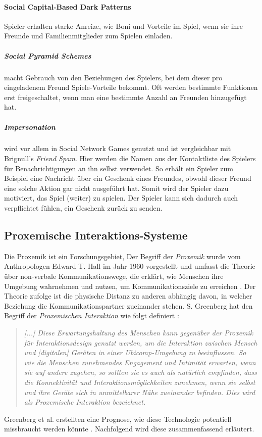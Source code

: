 \documentclass[a4paper]{article}
\newcommand{\todo}[1]{{\color{purple}{#1}}}
\begin{document}
\paragraph{Social Capital-Based Dark Patterns}
Spieler erhalten starke Anreize, wie Boni und Vorteile im Spiel, wenn sie ihre Freunde und Familienmitglieder zum Spielen einladen.

\subparagraph{Social Pyramid Schemes} macht Gebrauch von den Beziehungen des Spielers, bei dem dieser pro eingeladenem Freund Spiele-Vorteile bekommt. Oft werden bestimmte Funktionen erst freigeschaltet, wenn man eine bestimmte Anzahl an Freunden hinzugefügt hat.

\subparagraph{Impersonation} wird vor allem in Social Network Games genutzt und ist vergleichbar mit Brignull's \textit{Friend Spam}. Hier werden die Namen aus der Kontaktliste des Spielers für Benachrichtigungen an ihn selbst verwendet. So erhält ein Spieler zum Beispiel eine Nachricht über ein Geschenk eines Freundes, obwohl dieser Freund eine solche Aktion gar nicht ausgeführt hat. Somit wird der Spieler dazu motiviert, das Spiel (weiter) zu spielen. Der Spieler kann sich dadurch auch verpflichtet fühlen, ein Geschenk zurück zu senden.

\subsection{Proxemische Interaktions-Systeme}
\label{sub:proxemische_interaktions-systeme}{}
Die Proxemik ist ein Forschungsgebiet, 
Der Begriff der \textit{Proxemik} wurde vom Anthropologen Edward T. Hall im Jahr 1960 vorgestellt und umfasst die Theorie über non-verbale Kommunikationswege, die erklärt, wie Menschen ihre Umgebung wahrnehmen und nutzen, um Kommunikationsziele zu erreichen \cite{communicationstudies}. Der Theorie zufolge ist die physische Distanz zu anderen abhängig davon, in welcher Beziehung die Kommunikationspartner zueinander stehen. S. Greenberg hat den Begriff der \textit{Proxemischen Interaktion} wie folgt definiert \cite{marquardt}:\newline 
\begin{quote}
\textit{[...] Diese Erwartungshaltung des Menschen kann gegenüber der Proxemik für Interaktionsdesign genutzt werden, um die Interaktion zwischen Mensch und [digitalen] Geräten in einer Ubicomp-Umgebung \todo{Schönere Bezeichnung finden oder Definition formulieren} zu beeinflussen. So wie die Menschen zunehmendes Engagement und Intimität erwarten, wenn sie auf andere zugehen, so sollten sie es auch als natürlich empfinden, dass die Konnektivität und Interaktionsmöglichkeiten zunehmen, wenn sie selbst und ihre Geräte sich in unmittelbarer Nähe zueinander befinden. Dies wird als Proxemische Interaktion bezeichnet.}
\end{quote}
Greenberg et al. erstellten eine Prognose, wie diese Technologie potentiell missbraucht werden könnte \cite{greenberg}. Nachfolgend wird diese zusammenfassend erläutert.
\end{document}

